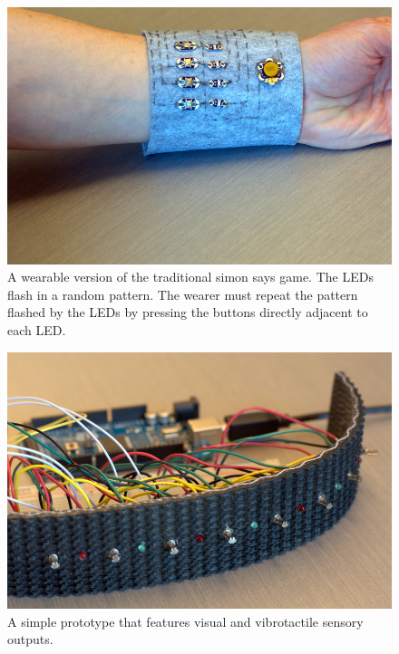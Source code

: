 \documentclass{chi-ext}
\begin{document}
\begin{figure}
  \begin{center}
  \includegraphics[width=\columnwidth]{images/P1130375.jpg}
  \caption{A wearable version of the traditional simon says game. The LEDs flash in a random pattern. The wearer must repeat the pattern flashed by the LEDs by pressing the buttons directly adjacent to each LED.}
  \label{fig:marginparsample}
  \end{center}  
\end{figure}


\begin{figure}
  \begin{center}
  \includegraphics[width=\columnwidth]{images/P1130386.jpg}
  \caption{A simple prototype that features visual and vibrotactile sensory outputs.}
  \label{fig:rubberVibeBand01}
  \end{center}  
\end{figure}
\end{document}
